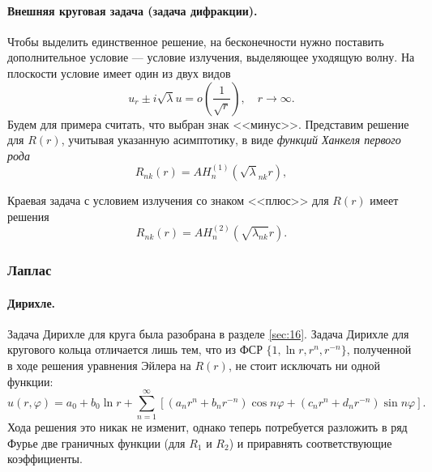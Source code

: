 \paragraph{Внешняя круговая задача (задача дифракции).}
Чтобы выделить единственное решение, на бесконечности нужно поставить
дополнительное условие --- условие излучения, выделяющее уходящую волну. На
плоскости условие имеет один из двух видов 
\[
    u_r \pm i\sqrt\lambda u = o \left( \frac{1}{\sqrt r} \right), \quad
    r\to\infty.
\]
Будем для примера считать, что выбран знак <<минус>>. Представим решение для $ R(r) $, учитывая указанную асимптотику, в виде
\emph{функций Ханкеля первого рода} 
\[
  R_{nk}(r) = A H^{(1)}_n(\sqrt\lambda_{nk} r),
\]


Краевая задача с условием излучения со знаком <<плюс>> для $ R(r) $ имеет
решения  
\[
  R_{nk}(r) = AH^{(2)}_n(\sqrt{\lambda_{nk}} r).
\]




\subsubsection{Лаплас}
\paragraph{Дирихле.} Задача Дирихле для круга была разобрана в разделе \ref{sec:16}. Задача Дирихле
для кругового кольца отличается лишь тем, что из ФСР $ \{1, \ln r, r^n, r^{-n}\}
$, полученной в ходе решения уравнения Эйлера на $ R(r) $, не стоит исключать ни
одной функции:
\[
  u(r,\varphi) = a_0 + b_0\ln r + \sum_{n=1}^\infty [(a_nr^n + b_nr^{-n})\cos
  n\varphi + (c_n r^n + d_n r^{-n})\sin n\varphi].
\]
Хода решения это никак не изменит, однако теперь потребуется
разложить в ряд Фурье две граничных функции (для $ R_1 $ и $ R_2 $) и приравнять
соответствующие коэффициенты.

